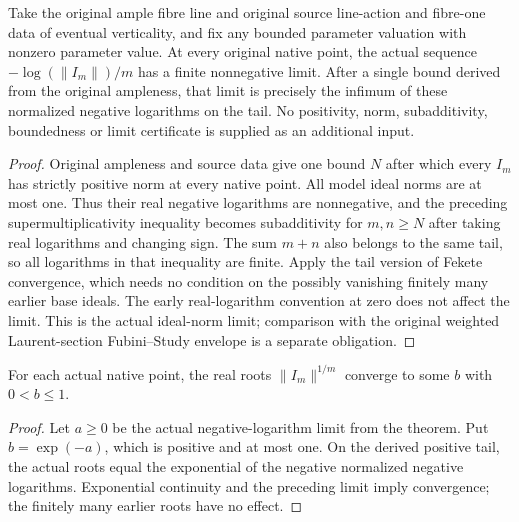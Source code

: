 \begin{theorem}\label{thm:native-test-configuration-fekete-limit}
\leanok
{}
Take the original ample fibre line and original source line-action and
fibre-one data of eventual verticality, and fix any bounded parameter
valuation with nonzero parameter value. At every original native point,
the actual sequence $-\log(\|I_m\|)/m$ has a finite nonnegative limit.
After a single bound derived from the original ampleness, that limit is
precisely the infimum of these normalized negative logarithms on the tail.
No positivity, norm, subadditivity, boundedness or limit certificate is
supplied as an additional input.
\end{theorem}
\begin{proof}
Original ampleness and source data give one bound $N$ after which every
$I_m$ has strictly positive norm at every native point. All model ideal
norms are at most one. Thus their real negative logarithms are nonnegative,
and the preceding supermultiplicativity inequality becomes subadditivity
for $m,n\geq N$ after taking real logarithms and changing sign. The sum
$m+n$ also belongs to the same tail, so all logarithms in that inequality
are finite. Apply the tail version of Fekete convergence, which needs no
condition on the possibly vanishing finitely many earlier base ideals.
The early real-logarithm convention at zero does not affect the limit.
This is the actual ideal-norm limit; comparison with the original weighted
Laurent-section Fubini--Study envelope is a separate obligation.
\end{proof}


\begin{corollary}\label{cor:native-test-configuration-root-limit}
\leanok
{}
For each actual native point, the real roots $\|I_m\|^{1/m}$ converge to
some $b$ with $0<b\leq1$.
\end{corollary}
\begin{proof}
Let $a\geq0$ be the actual negative-logarithm limit from the theorem.
Put $b=\exp(-a)$, which is positive and at most one. On the derived
positive tail, the actual roots equal the exponential of the negative
normalized negative logarithms. Exponential continuity and the preceding
limit imply convergence; the finitely many earlier roots have no effect.
\end{proof}
